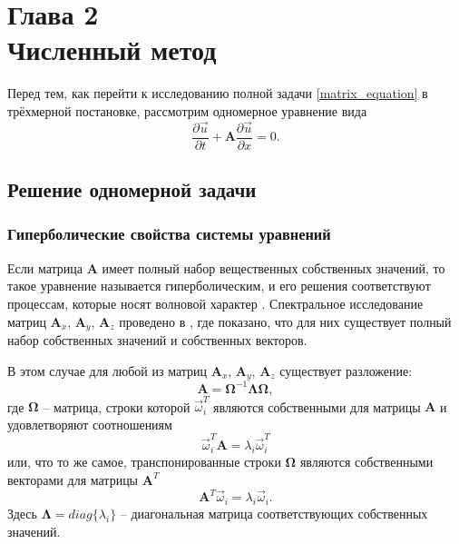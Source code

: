 \section*{Глава 2\\Численный метод}
\setcounter{section}{2}
\setcounter{subsection}{0}
\setcounter{equation}{0}

Перед тем, как перейти к исследованию полной задачи \eqref{matrix_equation} в трёхмерной постановке, рассмотрим одномерное уравнение вида
\begin{equation}
\frac{\partial\vec{u}}{\partial{t}}+\mathbf{A}\frac{\partial\vec{u}}{\partial{x}}=0.
\label{advection_equation}
\end{equation}

\subsection{Решение одномерной задачи}

\subsubsection{Гиперболические свойства системы уравнений}
\label{sec:hyperbolic_features}

Если матрица $\mathbf{A}$ имеет полный набор вещественных собственных значений, 
то такое уравнение называется гиперболическим, и его решения соответствуют 
процессам, которые носят волновой характер \cite{belocerkovsky, magomedov, chushkin}. Спектральное исследование матриц $\mathbf{A}_x$, $\mathbf{A}_y$, $\mathbf{A}_z$ проведено в \cite{chelnokov}, где показано, что для них существует полный набор собственных значений и собственных векторов.

В этом случае для любой из матриц $\mathbf{A}_x$, $\mathbf{A}_y$, $\mathbf{A}_z$ существует разложение:
\begin{equation}
\mathbf{A}=\mathbf\Omega^{-1}\mathbf\Lambda\mathbf\Omega,
\end{equation}
где $\mathbf\Omega$ -- матрица, строки которой $\vec\omega_i^T$ являются собственными для матрицы $\mathbf A$ и
удовлетворяют соотношениям
\begin{equation}
\vec\omega_i^T\mathbf A=\lambda_i\vec\omega_i^T
\end{equation}
или, что то же самое, транспонированные строки $\mathbf\Omega$ являются собственными векторами для матрицы $\mathbf A^T$
\begin{equation}
\mathbf A^T\vec\omega_i=\lambda_i\vec\omega_i.
\end{equation}
Здесь $\mathbf\Lambda=diag\{\lambda_i\}$ -- диагональная матрица соответствующих собственных значений.

